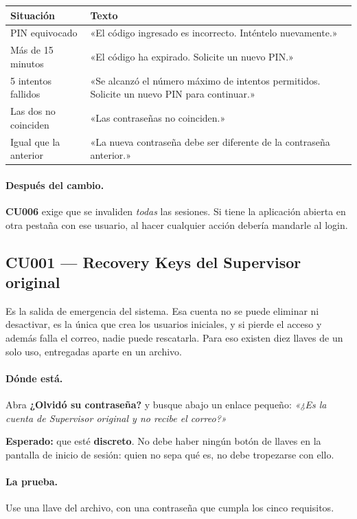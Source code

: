 \documentclass[11pt,a4paper]{article}
\newcommand{\cu}[1]{\textbf{CU#1}}
\begin{document}
\begin{center}
\begin{tabularx}{\textwidth}{lX}
\toprule
\textbf{Situación} & \textbf{Texto} \\
\midrule
PIN equivocado & «El código ingresado es incorrecto. Inténtelo nuevamente.» \\
Más de 15 minutos & «El código ha expirado. Solicite un nuevo PIN.» \\
5 intentos fallidos & «Se alcanzó el número máximo de intentos permitidos. Solicite un nuevo PIN para continuar.» \\
Las dos no coinciden & «Las contraseñas no coinciden.» \\
Igual que la anterior & «La nueva contraseña debe ser diferente de la contraseña anterior.» \\
\bottomrule
\end{tabularx}
\end{center}

\paragraph{Después del cambio.} \cu{006} exige que se invaliden \emph{todas} las
sesiones. Si tiene la aplicación abierta en otra pestaña con ese usuario, al
hacer cualquier acción debería mandarle al login.

\subsection{CU001 --- Recovery Keys del Supervisor original}

Es la salida de emergencia del sistema. Esa cuenta no se puede eliminar ni
desactivar, es la única que crea los usuarios iniciales, y si pierde el acceso
y además falla el correo, nadie puede rescatarla. Para eso existen diez llaves
de un solo uso, entregadas aparte en un archivo.

\paragraph{Dónde está.} Abra \textbf{¿Olvidó su contraseña?} y busque abajo un
enlace pequeño: \emph{«¿Es la cuenta de Supervisor original y no recibe el
correo?»}

\textbf{Esperado:} que esté \textbf{discreto}. No debe haber ningún botón de
llaves en la pantalla de inicio de sesión: quien no sepa qué es, no debe
tropezarse con ello.

\paragraph{La prueba.} Use una llave del archivo, con una contraseña que cumpla
los cinco requisitos.
\end{document}
